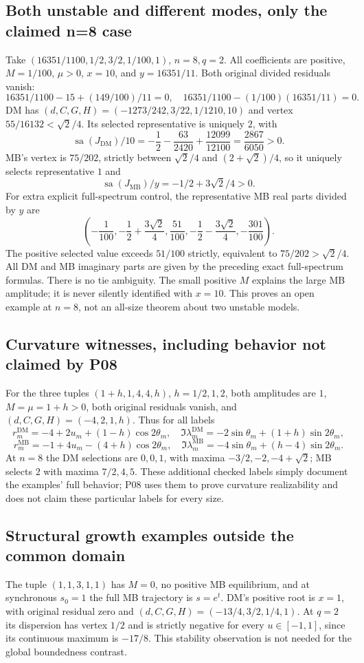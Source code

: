 \documentclass[11pt]{article}
\newcommand{\DM}{\mathrm{DM}}
\newcommand{\MB}{\mathrm{MB}}
\newcommand{\sa}{\operatorname{sa}}
\begin{document}
\subsection{Both unstable and different modes, only the claimed n=8 case}
Take $(16351/1100,1/2,3/2,1/100,1)$, $n=8,q=2$.
All coefficients are positive, $M=1/100$, $\mu>0$,
$x=10$, and $y=16351/11$. Both original divided residuals vanish:
\[
 16351/1100-15+(149/100)/11=0,
 \quad 16351/1100-(1/100)(16351/11)=0.
\]
DM has $(d,C,G,H)=(-1273/242,3/22,1/1210,10)$ and vertex
$55/16132<\sqrt2/4$. Its selected representative is uniquely $2$,
with
\[
 \sa(J_{\DM})/10=-\frac12-\frac{63}{2420}
                   +\frac{12099}{12100}=\frac{2867}{6050}>0.
\]
MB's vertex is $75/202$, strictly between $\sqrt2/4$ and
$(2+\sqrt2)/4$, so it uniquely selects representative $1$ and
\[
 \sa(J_{\MB})/y=-1/2+3\sqrt2/4>0.
\]
For extra explicit full-spectrum control, the representative MB real
parts divided by $y$ are
\[
 \left(-\frac1{100},-\frac12+\frac{3\sqrt2}{4},
                  \frac{51}{100},-\frac12-\frac{3\sqrt2}{4},
                  -\frac{301}{100}\right).
\]
The positive selected value exceeds $51/100$ strictly, equivalent to
$75/202>\sqrt2/4$. All DM and MB imaginary parts are given by the
preceding exact full-spectrum formulas. There is no tie ambiguity.
The small positive $M$ explains the large MB amplitude; it is never
silently identified with $x=10$. This proves an open example at $n=8$,
not an all-size theorem about two unstable models.

\subsection{Curvature witnesses, including behavior not claimed by P08}
For the three tuples $(1+h,1,4,4,h)$, $h=1/2,1,2$, both amplitudes
are $1$, $M=\mu=1+h>0$, both original residuals vanish, and
$(d,C,G,H)=(-4,2,1,h)$. Thus for all labels
\[
 r_m^{\DM}=-4+2u_m+(1-h)\cos2\theta_m,
 \quad\Im\lambda_m^{\DM}=-2\sin\theta_m+(1+h)\sin2\theta_m,
\]
\[
 r_m^{\MB}=-1+4u_m-(4+h)\cos2\theta_m,
 \quad\Im\lambda_m^{\MB}=-4\sin\theta_m+(h-4)\sin2\theta_m.
\]
At $n=8$ the DM selections are $0,0,1$, with maxima
$-3/2,-2,-4+\sqrt2$; MB selects $2$ with maxima $7/2,4,5$.
These additional checked labels simply document the examples' full
behavior; P08 uses them to prove curvature realizability and does not
claim these particular labels for every size.

\subsection{Structural growth examples outside the common domain}
The tuple $(1,1,3,1,1)$ has $M=0$, no positive MB equilibrium,
and at synchronous $s_0=1$ the full MB trajectory is $s=e^t$.
DM's positive root is $x=1$, with original residual zero and
$(d,C,G,H)=(-13/4,3/2,1/4,1)$. At $q=2$ its dispersion has vertex
$1/2$ and is strictly negative for every $u\in[-1,1]$, since its
continuous maximum is $-17/8$. This stability observation is not
needed for the global boundedness contrast.
\end{document}
